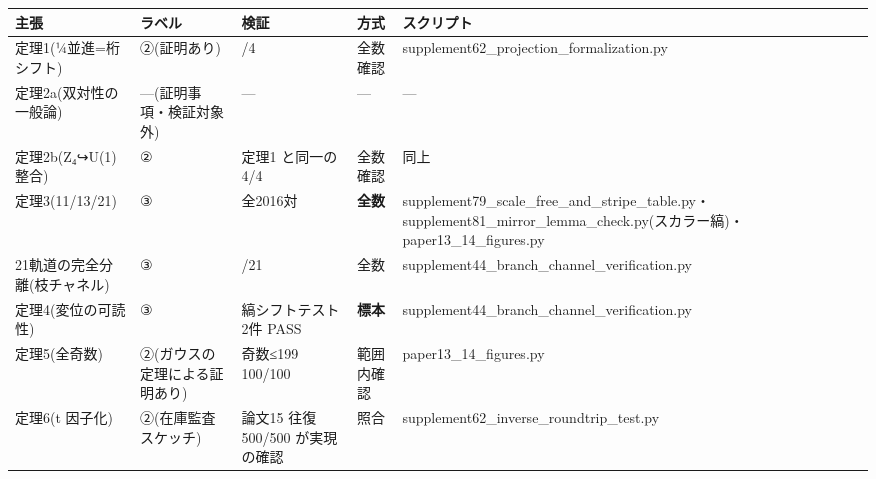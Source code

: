 \documentclass[
]{ltjsarticle}
\newcounter{none} %
\begin{document}
{\def\LTcaptype{none} %
\begin{longtable}[]{@{}
  >{\raggedright\arraybackslash}p{}
  >{\raggedright\arraybackslash}p{}
  >{\raggedright\arraybackslash}p{}
  >{\raggedright\arraybackslash}p{}
  >{\raggedright\arraybackslash}p{}@{}}
\toprule\noalign{}
\begin{minipage}[b]{\linewidth}\raggedright
主張
\end{minipage} & \begin{minipage}[b]{\linewidth}\raggedright
ラベル
\end{minipage} & \begin{minipage}[b]{\linewidth}\raggedright
検証
\end{minipage} & \begin{minipage}[b]{\linewidth}\raggedright
方式
\end{minipage} & \begin{minipage}[b]{\linewidth}\raggedright
スクリプト
\end{minipage} \\
\midrule\noalign{}
\endhead
\bottomrule\noalign{}
\endlastfoot
定理1(¼並進=桁シフト) & ②(証明あり) & 4/4 & 全数確認 &
supplement62\_projection\_formalization.py \\
定理2a(双対性の一般論) & ---(証明事項・検証対象外) & --- & --- & --- \\
定理2b(Z₄↪U(1) 整合) & ② & 定理1 と同一の 4/4 & 全数確認 & 同上 \\
定理3(11/13/21) & ③ & 全2016対 & \textbf{全数} &
supplement79\_scale\_free\_and\_stripe\_table.py・supplement81\_mirror\_lemma\_check.py(スカラー縞)・paper13\_14\_figures.py \\
21軌道の完全分離(枝チャネル) & ③ & 21/21 & 全数 &
supplement44\_branch\_channel\_verification.py \\
定理4(変位の可読性) & ③ & 縞シフトテスト2件 PASS & \textbf{標本} &
supplement44\_branch\_channel\_verification.py \\
定理5(全奇数) & ②(ガウスの定理による証明あり) & 奇数≤199 100/100 &
範囲内確認 & paper13\_14\_figures.py \\
定理6(t 因子化) & ②(在庫監査スケッチ) & 論文15 往復 500/500 が実現の確認
& 照合 & supplement62\_inverse\_roundtrip\_test.py \\
\end{longtable}
}
\end{document}
